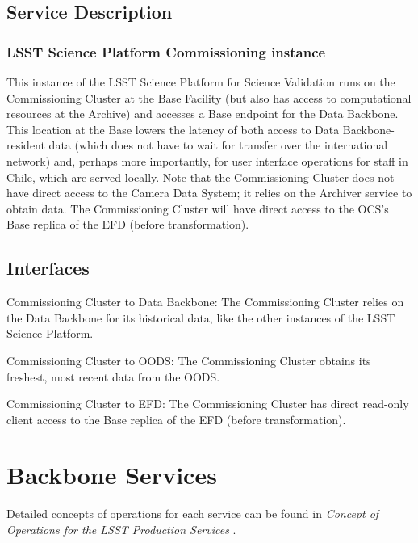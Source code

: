 \documentclass[DM,toc]{lsstdoc}
\begin{document}
\subsection{Service Description}\label{commcluster-service}

\subsubsection{LSST Science Platform Commissioning
instance}\label{lsst-science-platform-commissioning-instance}

This instance of the LSST Science Platform for Science Validation runs
on the Commissioning Cluster at the Base Facility (but also has access
to computational resources at the Archive) and accesses a Base endpoint
for the Data Backbone. This location at the Base lowers the latency of
both access to Data Backbone-resident data (which does not have to wait
for transfer over the international network) and, perhaps more
importantly, for user interface operations for staff in Chile, which are
served locally. Note that the Commissioning Cluster does not have direct
access to the Camera Data System; it relies on the Archiver service to
obtain data. The Commissioning Cluster will have direct access to the
OCS's Base replica of the EFD (before transformation).

\subsection{Interfaces}\label{commcluster-interfaces}

Commissioning Cluster to Data Backbone: The Commissioning Cluster relies on the
Data Backbone for its historical data, like the other instances of the LSST Science
Platform.

Commissioning Cluster to OODS: The Commissioning Cluster obtains its freshest, most recent data from the OODS.

Commissioning Cluster to EFD: The Commissioning Cluster has direct read-only
client access to the Base replica of the EFD (before transformation).

\section{Backbone Services}\label{backbone-services}

Detailed concepts of operations for each service can be found in \textit{Concept of Operations for the LSST Production Services} .
\end{document}
